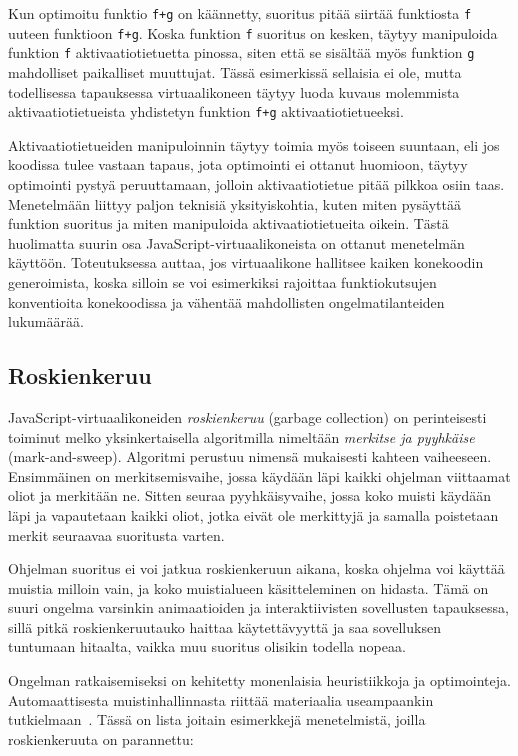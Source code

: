 Kun optimoitu funktio \texttt{f+g} on käännetty, suoritus pitää siirtää funktiosta \texttt{f} uuteen funktioon \texttt{f+g}. Koska funktion \texttt{f} suoritus on kesken, täytyy manipuloida funktion \texttt{f} aktivaatiotietuetta pinossa, siten että se sisältää myös funktion \texttt{g} mahdolliset paikalliset muuttujat. Tässä esimerkissä sellaisia ei ole, mutta todellisessa tapauksessa virtuaalikoneen täytyy luoda kuvaus molemmista aktivaatiotietueista yhdistetyn funktion \texttt{f+g} aktivaatiotietueeksi.

Aktivaatiotietueiden manipuloinnin täytyy toimia myös toiseen suuntaan, eli jos koodissa tulee vastaan tapaus, jota optimointi ei ottanut huomioon, täytyy optimointi pystyä peruuttamaan, jolloin aktivaatiotietue pitää pilkkoa osiin taas. Menetelmään liittyy paljon teknisiä yksityiskohtia, kuten miten pysäyttää funktion suoritus ja miten manipuloida aktivaatiotietueita oikein. Tästä huolimatta suurin osa JavaScript-virtuaalikoneista on ottanut menetelmän käyttöön. Toteutuksessa auttaa, jos virtuaalikone hallitsee kaiken konekoodin generoimista, koska silloin se voi esimerkiksi rajoittaa funktiokutsujen konventioita konekoodissa ja vähentää mahdollisten ongelmatilanteiden lukumäärää.

\subsection{Roskienkeruu}

JavaScript-virtuaalikoneiden \textit{roskienkeruu} (garbage collection) on perinteisesti toiminut melko yksinkertaisella algoritmilla nimeltään \textit{merkitse ja pyyhkäise} (mark-and-sweep). Algoritmi perustuu nimensä mukaisesti kahteen vaiheeseen. Ensimmäinen on merkitsemisvaihe, jossa käydään läpi kaikki ohjelman viittaamat oliot ja merkitään ne. Sitten seuraa pyyhkäisyvaihe, jossa koko muisti käydään läpi ja vapautetaan kaikki oliot, jotka eivät ole merkittyjä ja samalla poistetaan merkit seuraavaa suoritusta varten.

Ohjelman suoritus ei voi jatkua roskienkeruun aikana, koska ohjelma voi käyttää muistia milloin vain, ja koko muistialueen käsitteleminen on hidasta. Tämä on suuri ongelma varsinkin animaatioiden ja interaktiivisten sovellusten tapauksessa, sillä pitkä roskienkeruutauko haittaa käytettävyyttä ja saa sovelluksen tuntumaan hitaalta, vaikka muu suoritus olisikin todella nopeaa.

Ongelman ratkaisemiseksi on kehitetty monenlaisia heuristiikkoja ja optimointeja. Automaattisesta muistinhallinnasta riittää materiaalia useampaankin tutkielmaan~\cite{gcbib}. Tässä on lista joitain esimerkkejä menetelmistä, joilla roskienkeruuta on parannettu:

